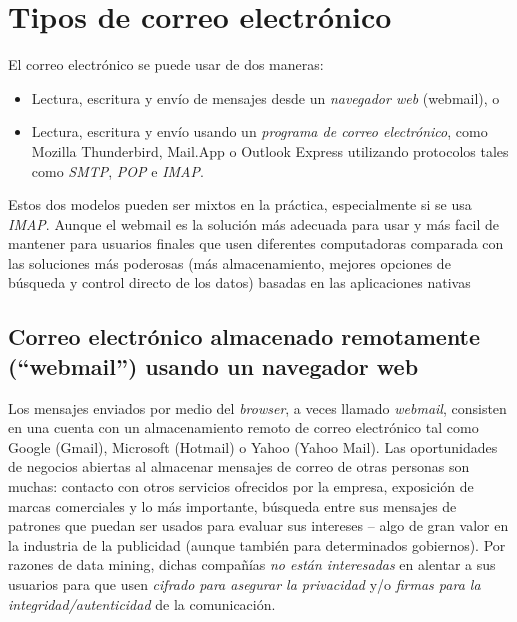 \documentclass[10pt,a5paper,twoside,,]{book}
\begin{document}
\chapter{Tipos de correo
electrónico}\label{tipos-de-correo-electruxf3nico}

El correo electrónico se puede usar de dos maneras:

\begin{itemize}
\item
  Lectura, escritura y envío de mensajes desde un \emph{navegador web}
  (webmail), o
\item
  Lectura, escritura y envío usando un \emph{programa de correo
  electrónico}, como Mozilla Thunderbird, Mail.App o Outlook Express
  utilizando protocolos tales como \emph{SMTP}, \emph{POP} e
  \emph{IMAP}.
\end{itemize}

Estos dos modelos pueden ser mixtos en la práctica, especialmente si se
usa \emph{IMAP}. Aunque el webmail es la solución más adecuada para usar
y más facil de mantener para usuarios finales que usen diferentes
computadoras comparada con las soluciones más poderosas (más
almacenamiento, mejores opciones de búsqueda y control directo de los
datos) basadas en las aplicaciones nativas

\section{\texorpdfstring{Correo electrónico almacenado remotamente
(``webmail'') usando un navegador
web}{Correo electrónico almacenado remotamente (webmail) usando un navegador web}}\label{correo-electruxf3nico-almacenado-remotamente-webmail-usando-un-navegador-web}

Los mensajes enviados por medio del \emph{browser}, a veces llamado
\emph{webmail}, consisten en una cuenta con un almacenamiento remoto de
correo electrónico tal como Google (Gmail), Microsoft (Hotmail) o Yahoo
(Yahoo Mail). Las oportunidades de negocios abiertas al almacenar
mensajes de correo de otras personas son muchas: contacto con otros
servicios ofrecidos por la empresa, exposición de marcas comerciales y
lo más importante, búsqueda entre sus mensajes de patrones que puedan
ser usados para evaluar sus intereses -- algo de gran valor en la
industria de la publicidad (aunque también para determinados gobiernos).
Por razones de data mining, dichas compañías \emph{no están interesadas}
en alentar a sus usuarios para que usen \emph{cifrado para asegurar la
privacidad} y/o \emph{firmas para la integridad/autenticidad} de la
comunicación.
\end{document}

